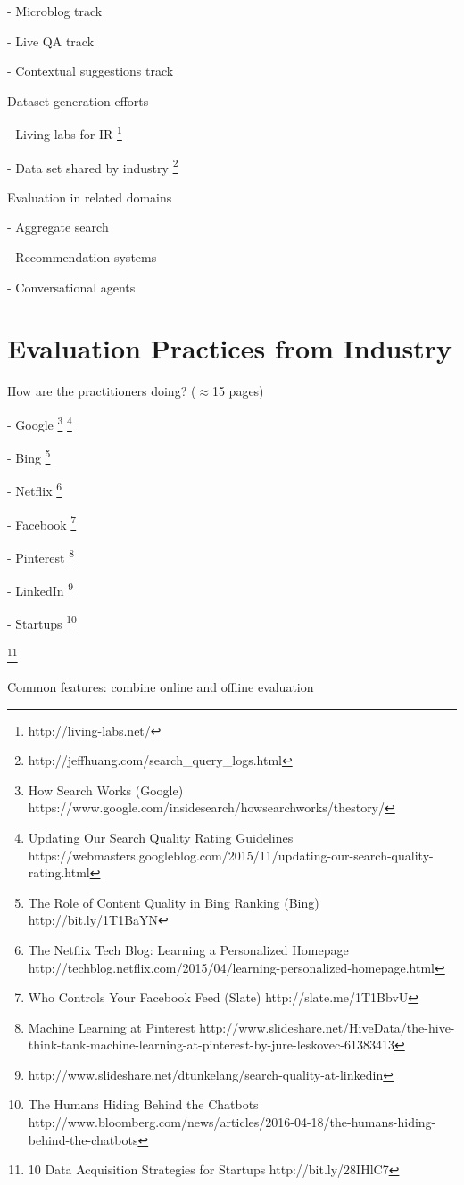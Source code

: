 \documentclass[openany]{now} %
\newcommand{\newpar}{\bigskip\noindent}
\begin{document}
- Microblog track

- Live QA track

- Contextual suggestions track

\newpar
Dataset generation efforts

- Living labs for IR \footnote{http://living-labs.net/}

- Data set shared by industry \footnote{http://jeffhuang.com/search\_query\_logs.html}

\newpar
Evaluation in related domains

- Aggregate search \cite{Zhou:2013}

- Recommendation systems \cite{gunawardana2015evaluating}

- Conversational agents

\section{Evaluation Practices from Industry}

How are the practitioners doing? (\ensuremath{\approx}15 pages)

- Google \footnote{How Search Works (Google) https://www.google.com/insidesearch/howsearchworks/thestory/} \footnote{Updating Our Search Quality Rating Guidelines
	 https://webmasters.googleblog.com/2015/11/updating-our-search-quality-rating.html}

- Bing \footnote{The Role of Content Quality in Bing Ranking (Bing)
	 http://bit.ly/1T1BaYN}

- Netflix \cite{Gomez-Uribe2015}  \footnote{The Netflix Tech Blog: Learning a Personalized Homepage
	http://techblog.netflix.com/2015/04/learning-personalized-homepage.html}

- Facebook \footnote{Who Controls Your Facebook Feed (Slate) http://slate.me/1T1BbvU}

- Pinterest \footnote{Machine Learning at Pinterest http://www.slideshare.net/HiveData/the-hive-think-tank-machine-learning-at-pinterest-by-jure-leskovec-61383413}

- LinkedIn \footnote{http://www.slideshare.net/dtunkelang/search-quality-at-linkedin}

- Startups \footnote{The Humans Hiding Behind the Chatbots http://www.bloomberg.com/news/articles/2016-04-18/the-humans-hiding-behind-the-chatbots}

\footnote{10 Data Acquisition Strategies for Startups http://bit.ly/28IHlC7}

\newpar
Common features: combine online and offline evaluation
\end{document}
